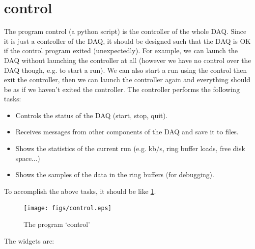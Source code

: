\documentclass[a4paper,12pt]{article}
\begin{document}
	\section{control}
	The program control (a python script) is the controller of the whole
	DAQ. Since it is just a controller of the DAQ, it should be designed
	such that the DAQ is OK if the control program exited (unexpectedly).
	For example, we can launch the DAQ without launching the controller at
	all (however we have no control over the DAQ though, e.g. to start a
	run).  We can also start a run using the control then exit the
	controller, then we can launch the controller again and everything
	should be as if we haven't exited the controller. The controller
	performs the following tasks:
	\begin{itemize}
		\item Controls the status of the DAQ (start, stop, quit).
		\item Receives messages from other components of the DAQ and save it
			to files. 
		\item Shows the statistics of the current run (e.g. kb/s, ring buffer
			loads, free disk space...)
		\item Shows the samples of the data in the ring buffers (for
			debugging).
	\end{itemize}
	To accomplish the above tasks, it should be like \ref{fig04}.
	\begin{figure}
		\begin{center}
			\texttt{[image: figs/control.eps]}
			\caption{\label{fig04}The program `control'}
		\end{center}
	\end{figure}
	The widgets are:
\end{document}
